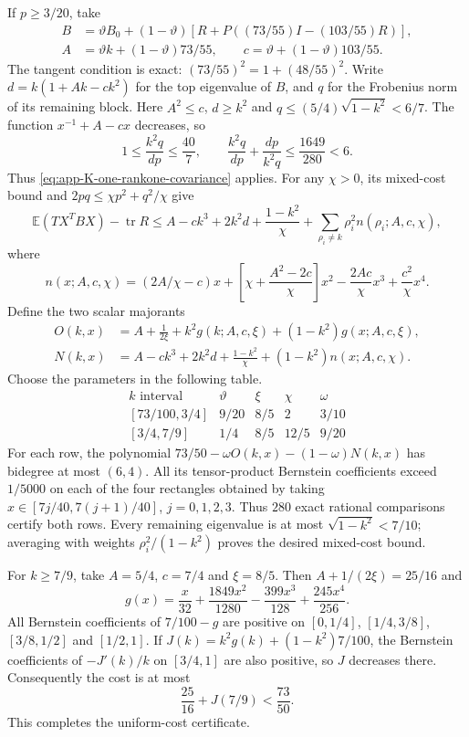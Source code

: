 \documentclass[11pt,a4paper]{article}
\numberwithin{equation}{section}
\begin{document}
If $p\ge3/20$, take
\[
 \begin{aligned}
 B&=\vartheta B_0+(1-\vartheta)
       [R+P((73/55)I-(103/55)R)],\\
 A&=\vartheta k+(1-\vartheta)73/55,\qquad
 c=\vartheta+(1-\vartheta)103/55.
 \end{aligned}
\]
The tangent condition is exact: $(73/55)^2=1+(48/55)^2$.
Write $d=k(1+Ak-ck^2)$ for the top eigenvalue of $B$, and
$q$ for the Frobenius norm of its remaining block.
Here $A^2\le c$, $d\ge k^2$ and
$q\le(5/4)\sqrt{1-k^2}<6/7$.
The function $x^{-1}+A-cx$ decreases, so
\[
 1\le\frac{k^2q}{dp}\le\frac{40}{7},\qquad
 \frac{k^2q}{dp}+\frac{dp}{k^2q}\le\frac{1649}{280}<6.
\]
Thus \eqref{eq:app-K-one-rankone-covariance} applies.
For any $\chi>0$, its mixed-cost bound and $2pq\le\chi p^2+q^2/\chi$ give
\[
 \mathbb E(TX^TBX)-\operatorname{tr}R
 \le A-ck^3+2k^2d+\frac{1-k^2}{\chi}
       +\sum_{\rho_i\ne k}\rho_i^2 n(\rho_i;A,c,\chi),
\]
where
\[
 n(x;A,c,\chi)=(2A/\chi-c)x+
       \left[\chi+\frac{A^2-2c}{\chi}\right]x^2
       -\frac{2Ac}{\chi}x^3+\frac{c^2}{\chi}x^4.
\]
Define the two scalar majorants
\[
 \begin{split}
 O(k,x)&=A+\frac1{2\xi}+k^2g(k;A,c,\xi)
                    +(1-k^2)g(x;A,c,\xi),\\
 N(k,x)&=A-ck^3+2k^2d+\frac{1-k^2}{\chi}
                    +(1-k^2)n(x;A,c,\chi).
 \end{split}
\]
Choose the parameters in the following table.
\[
\begin{array}{c|c|c|c|c}
 k\text{ interval}&\vartheta&\xi&\chi&\omega\\\hline
 {}[73/100,3/4]&9/20&8/5&2&3/10\\
 {}[3/4,7/9]&1/4&8/5&12/5&9/20
\end{array}
\]
For each row, the polynomial
$73/50-\omega O(k,x)-(1-\omega)N(k,x)$ has bidegree at most $(6,4)$.
All its tensor-product Bernstein coefficients exceed $1/5000$ on each
of the four rectangles obtained by taking
$x\in[7j/40,7(j+1)/40]$, $j=0,1,2,3$. Thus $280$ exact rational
comparisons certify both rows. Every remaining eigenvalue is at most
$\sqrt{1-k^2}<7/10$; averaging with weights
$\rho_i^2/(1-k^2)$ proves the desired mixed-cost bound.

For $k\ge7/9$, take $A=5/4$, $c=7/4$ and $\xi=8/5$.
Then $A+1/(2\xi)=25/16$ and
\[
 g(x)=\frac{x}{32}+\frac{1849x^2}{1280}
                 -\frac{399x^3}{128}+\frac{245x^4}{256}.
\]
All Bernstein coefficients of $7/100-g$ are positive on
$[0,1/4]$, $[1/4,3/8]$, $[3/8,1/2]$ and $[1/2,1]$.
If $J(k)=k^2g(k)+(1-k^2)7/100$, the Bernstein coefficients of
$-J'(k)/k$ on $[3/4,1]$ are also positive, so $J$ decreases there.
Consequently the cost is at most
\[
 \frac{25}{16}+J(7/9)
 <\frac{73}{50}.
\]
This completes the uniform-cost certificate.
\end{document}
